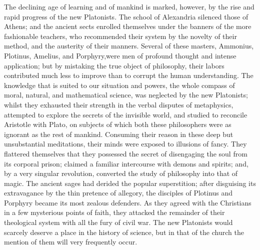 The declining age of learning and of mankind is marked, however,
by the rise and rapid progress of the new Platonists. The school
of Alexandria silenced those of Athens; and the ancient sects
enrolled themselves under the banners of the more fashionable
teachers, who recommended their system by the novelty of their
method, and the austerity of their manners. Several of these
masters, Ammonius, Plotinus, Amelius, and Porphyry,\footnotemark[124] were men
of profound thought and intense application; but by mistaking the
true object of philosophy, their labors contributed much less to
improve than to corrupt the human understanding. The knowledge
that is suited to our situation and powers, the whole compass of
moral, natural, and mathematical science, was neglected by the
new Platonists; whilst they exhausted their strength in the
verbal disputes of metaphysics, attempted to explore the secrets
of the invisible world, and studied to reconcile Aristotle with
Plato, on subjects of which both these philosophers were as
ignorant as the rest of mankind. Consuming their reason in these
deep but unsubstantial meditations, their minds were exposed to
illusions of fancy. They flattered themselves that they possessed
the secret of disengaging the soul from its corporal prison;
claimed a familiar intercourse with demons and spirits; and, by a
very singular revolution, converted the study of philosophy into
that of magic. The ancient sages had derided the popular
superstition; after disguising its extravagance by the thin
pretence of allegory, the disciples of Plotinus and Porphyry
became its most zealous defenders. As they agreed with the
Christians in a few mysterious points of faith, they attacked the
remainder of their theological system with all the fury of civil
war. The new Platonists would scarcely deserve a place in the
history of science, but in that of the church the mention of them
will very frequently occur.



